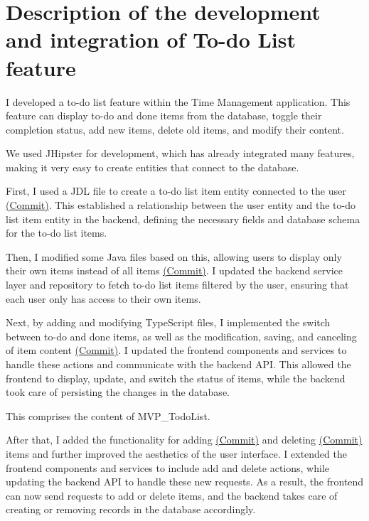 \documentclass[a4paper]{article}
\begin{document}
\newpage
\section{Description of the development and integration of To-do List feature}

I developed a to-do list feature within the Time Management application. This feature can display to-do and done items from the database, toggle their completion status, add new items, delete old items, and modify their content.

We used JHipster for development, which has already integrated many features, making it very easy to create entities that connect to the database.



First, I used a JDL file to create a to-do list item entity connected to the user \href{https://git.cs.bham.ac.uk/team-projects-2022-23/team23-22/-/commit/72ab4910e6f8cb736062106f8eb215b73dd6bccb}{(Commit)}. This established a relationship between the user entity and the to-do list item entity in the backend, defining the necessary fields and database schema for the to-do list items.

Then, I modified some Java files based on this, allowing users to display only their own items instead of all items \href{https://git.cs.bham.ac.uk/team-projects-2022-23/team23-22/-/commit/c8833aae6fdc3d7390659155b1eab6a9e4fc96e5}{(Commit)}. I updated the backend service layer and repository to fetch to-do list items filtered by the user, ensuring that each user only has access to their own items.

Next, by adding and modifying TypeScript files, I implemented the switch between to-do and done items, as well as the modification, saving, and canceling of item content \href{https://git.cs.bham.ac.uk/team-projects-2022-23/team23-22/-/commit/81c0ab748310b8ee97757cc85d779b9cc70da6e6}{(Commit)}. I updated the frontend components and services to handle these actions and communicate with the backend API. This allowed the frontend to display, update, and switch the status of items, while the backend took care of persisting the changes in the database.

This comprises the content of MVP\_TodoList.

After that, I added the functionality for adding \href{https://git.cs.bham.ac.uk/team-projects-2022-23/team23-22/-/commit/fbd8b6dd71adf9d4019cfcf248393c32c3583684}{(Commit)} and deleting \href{https://git.cs.bham.ac.uk/team-projects-2022-23/team23-22/-/commit/8c186f9af83cc6132600a6bf85adcb36ae614f54}{(Commit)} items and further improved the aesthetics of the user interface. I extended the frontend components and services to include add and delete actions, while updating the backend API to handle these new requests. As a result, the frontend can now send requests to add or delete items, and the backend takes care of creating or removing records in the database accordingly.
\end{document}

